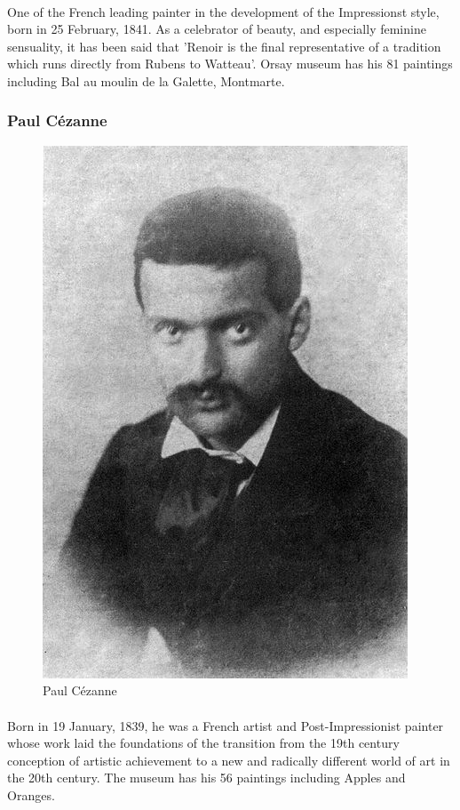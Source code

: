 \documentclass[
10pt, %
a4paper, %
oneside, %
headinclude,footinclude, %
BCOR5mm, %
]{scrartcl}
\theoremstyle{definition} %
\theoremstyle{plain} %
\theoremstyle{remark} %
\begin{document}
\paragraph{}
One of the French leading painter in the development of the Impressionst style, born in 25 February, 1841. As a celebrator of beauty, and especially feminine sensuality, it has been said that 'Renoir is the final representative of a tradition which runs directly from Rubens to Watteau'. Orsay museum has his 81 paintings including Bal au moulin de la Galette, Montmarte.

\subsubsection{Paul Cézanne}
\begin{figure}[tbH]
\centering
\includegraphics[width=.30\columnwidth]{Images/14.png}
\caption[Paul Cézanne]{Paul Cézanne} %
\label{fig:cezanne}
\end{figure}

\paragraph{}
Born in 19 January, 1839, he was a French artist and Post-Impressionist painter whose work laid the foundations  of the transition from the 19th century conception of artistic achievement to a new and radically different world of art in the 20th century. The museum has his 56 paintings including Apples and Oranges.
\end{document}
